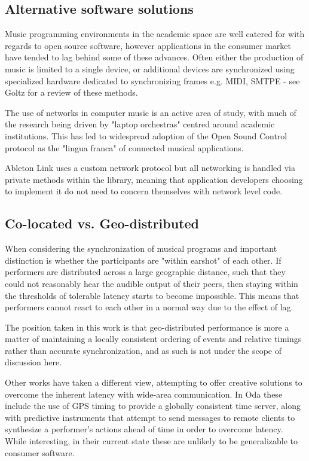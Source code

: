 \documentclass[11pt]{article} %
\theoremstyle{plain}
\theoremstyle{definition}
\begin{document}
\subsection{Alternative software solutions}

Music programming environments in the academic space are well catered for with
regards to open source software, however applications in the consumer market
have tended to lag behind some of these advances. Often either the production
of music is limited to a single device, or additional devices are synchronized
using specialized hardware dedicated to synchronizing frames e.g. MIDI, SMTPE -
see Goltz\cite{goltz2018ableton} for a review of these methods.

The use of networks in computer music is an active area of study, with much of
the research being driven by "laptop orchestras"\cite{trueman2007laptop}
centred around academic institutions. This has led to widespread adoption of
the Open Sound Control
protocol\cite{wright2005open}\cite{madgwick2015simple}\cite{narveson2013landini}
as the "lingua franca" of connected musical applications.

Ableton Link uses a custom network protocol but all networking is handled via
private methods within the library, meaning that application developers
choosing to implement it do not need to concern themselves with network level code.

\subsection{Co-located vs. Geo-distributed}

When considering the synchronization of musical programs and important
distinction is whether the participants are "within earshot" of each other. If
performers are distributed across a large geographic distance, such that they
could not reasonably hear the audible output of their peers, then staying
within the thresholds of tolerable latency starts to become impossible. This
means that performers cannot react to each other in a normal way due to the
effect of lag.

The position taken in this work is that geo-distributed performance is more a
matter of maintaining a locally consistent ordering of events and relative
timings rather than accurate synchronization, and as such is not under the
scope of discussion here.

Other works have taken a different view, attempting to offer creative solutions
to overcome the inherent latency with wide-area communication. In
Oda\cite{oda2017tools} these include the use of GPS timing to provide a
globally consistent time server, along with predictive instruments that attempt
to send messages to remote clients to synthesize a performer's actions ahead of
time in order to overcome latency. While interesting, in their current state
these are unlikely to be generalizable to consumer software.
\end{document}

